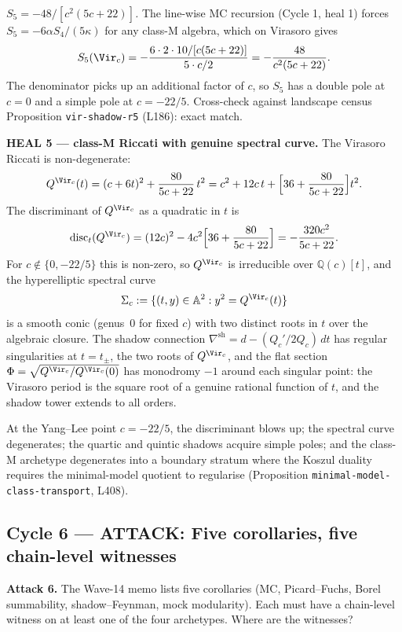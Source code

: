 \emph{$S_5 = -48/[c^2(5c+22)]$.} The line-wise MC recursion
(Cycle 1, heal 1) forces $S_5 = -6\alpha S_4/(5\kappa)$ for any
class-M algebra, which on Virasoro gives
\[
  S_5(\Vir_c) = -\frac{6\cdot 2\cdot 10/[c(5c+22)]}{5\cdot c/2}
             = -\frac{48}{c^2(5c+22)}.
\]
The denominator picks up an additional factor of $c$, so $S_5$ has a
double pole at $c = 0$ and a simple pole at $c = -22/5$. Cross-check
against landscape census
Proposition \texttt{vir-shadow-r5} (L186): exact match.

\textbf{HEAL 5 --- class-M Riccati with genuine spectral curve.}
The Virasoro Riccati is non-degenerate:
\[
  Q^{\Vir_c}(t) = (c + 6t)^2 + \frac{80}{5c+22}\,t^2
              = c^2 + 12 c\,t + \Bigl[36 + \frac{80}{5c+22}\Bigr] t^2.
\]
The discriminant of $Q^{\Vir_c}$ as a quadratic in $t$ is
\[
  \operatorname{disc}_t(Q^{\Vir_c})
  = (12c)^2 - 4c^2\Bigl[36 + \frac{80}{5c+22}\Bigr]
  = -\frac{320 c^2}{5c+22}.
\]
For $c \notin \{0, -22/5\}$ this is non-zero, so $Q^{\Vir_c}$ is
irreducible over $\mathbb Q(c)[t]$, and the hyperelliptic spectral
curve
\[
  \Sigma_c := \{(t, y) \in \mathbb A^2 : y^2 = Q^{\Vir_c}(t)\}
\]
is a smooth conic (genus~$0$ for fixed $c$) with two distinct roots
in $t$ over the algebraic closure. The shadow connection
$\nabla^{\mathrm{sh}} = d - (Q_c'/2 Q_c)\,dt$ has regular singularities
at $t = t_\pm$, the two roots of $Q^{\Vir_c}$, and the flat section
$\Phi = \sqrt{Q^{\Vir_c}/Q^{\Vir_c}(0)}$ has monodromy $-1$ around
each singular point: the Virasoro period is the square root of a
genuine rational function of $t$, and the shadow tower extends to
all orders.

At the Yang--Lee point $c = -22/5$, the discriminant blows up; the
spectral curve degenerates; the quartic and quintic shadows acquire
simple poles; and the class-M archetype degenerates into a
boundary stratum where the Koszul duality requires the minimal-model
quotient to regularise (Proposition
\texttt{minimal-model-class-transport}, L408).

\subsection*{Cycle 6 --- ATTACK: Five corollaries, five chain-level
witnesses}

\textbf{Attack 6.} The Wave-14 memo lists five corollaries (MC,
Picard--Fuchs, Borel summability, shadow--Feynman, mock modularity).
Each must have a chain-level witness on at least one of the four
archetypes. Where are the witnesses?

